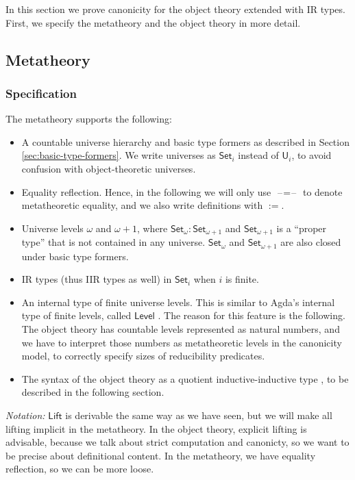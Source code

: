 \documentclass[acmsmall,screen,review,anonymous]{acmart}
\newcommand{\msf}[1]{{\mathsf{#1}}}
\newcommand{\U}{\msf{U}}
\newcommand{\Set}{\msf{Set}}
\newcommand{\Lift}{\msf{Lift}}
\newcommand{\blank}{{\mathord{\hspace{1pt}\text{--}\hspace{1pt}}}}
\newcommand{\Level}{\msf{Level}}
\begin{document}
In this section we prove canonicity for the object theory extended with IR types. First, we specify
the metatheory and the object theory in more detail.

\subsection{Metatheory}\label{sec:metatheory}

\subsubsection{Specification} The metatheory supports the following:
\begin{itemize}
  \item A countable universe hierarchy and basic type formers as described in Section \ref{sec:basic-type-formers}.
    We write universes as $\Set_i$ instead of $\U_i$, to avoid confusion with object-theoretic
    universes.
  \item Equality reflection. Hence, in the following we will only use $\blank\!=\!\blank$ to denote
    metatheoretic equality, and we also write definitions with $:=$.
  \item Universe levels $\omega$ and $\omega+1$, where $\Set_\omega : \Set_{\omega + 1}$ and $\Set_{\omega + 1}$
        is a ``proper type'' that is not contained in any universe. $\Set_\omega$ and $\Set_{\omega + 1}$ are
        also closed under basic type formers.
  \item IR types (thus IIR types as well) in $\Set_i$ when $i$ is finite.
  \item An internal type of finite universe levels. This is similar to Agda's internal type of
    finite levels, called $\Level$ \cite{agdadocs}. The reason for this feature is the following. The
    object theory has countable levels represented as natural numbers, and we have to interpret
    those numbers as metatheoretic levels in the canonicity model, to correctly specify sizes of
    reducibility predicates.
  \item The syntax of the object theory as a quotient inductive-inductive type \cite{ttintt,DBLP:journals/corr/abs-2302-08837}, to be
    described in the following section.
\end{itemize}
\emph{Notation:} $\Lift$ is derivable the same way as we have seen, but we will make all
lifting implicit in the metatheory. In the object theory, explicit lifting is advisable, because
we talk about strict computation and canonicty, so we want to be precise about definitional
content. In the metatheory, we have equality reflection, so we can be more loose.
\end{document}
